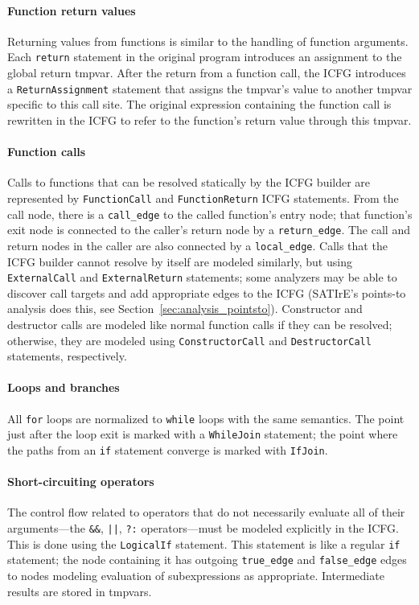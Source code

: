 \documentclass[a4paper,12pt]{report}
\begin{document}
\paragraph{Function return values} Returning values from functions is
similar to the handling of function arguments. Each \verb|return| statement
in the original program introduces an assignment to the global return
tmpvar. After the return from a function call, the ICFG introduces a
\verb|ReturnAssignment| statement that assigns the tmpvar's value to another
tmpvar specific to this call site. The original expression containing the
function call is rewritten in the ICFG to refer to the function's return
value through this tmpvar.

\paragraph{Function calls} Calls to functions that can be resolved
statically by the ICFG builder are represented by \verb|FunctionCall| and
\verb|FunctionReturn| ICFG statements. From the call node, there is a
\verb|call_edge| to the called function's entry node; that function's exit
node is connected to the caller's return node by a \verb|return_edge|. The
call and return nodes in the caller are also connected by a
\verb|local_edge|. Calls that the ICFG builder cannot resolve by itself are
modeled similarly, but using \verb|ExternalCall| and \verb|ExternalReturn|
statements; some analyzers may be able to discover call targets and add
appropriate edges to the ICFG (SATIrE's points-to analysis does this, see
Section~\ref{sec:analysis_pointsto}). Constructor and destructor calls are
modeled like normal function calls if they can be resolved; otherwise, they
are modeled using \verb|ConstructorCall| and \verb|DestructorCall|
statements, respectively.

\paragraph{Loops and branches} All \verb|for| loops are normalized to
\verb|while| loops with the same semantics. The point just after the loop
exit is marked with a \verb|WhileJoin| statement; the point where the paths
from an \verb|if| statement converge is marked with \verb|IfJoin|.

\paragraph{Short-circuiting operators} The control flow related to operators
that do not necessarily evaluate all of their arguments---the \verb|&&|,
\verb&||&, \verb|?:| operators---must be modeled explicitly in the ICFG.
This is done using the \verb|LogicalIf| statement. This statement is like a
regular \verb|if| statement; the node containing it has outgoing
\verb|true_edge| and \verb|false_edge| edges to nodes modeling evaluation of
subexpressions as appropriate. Intermediate results are stored in tmpvars.
\end{document}
